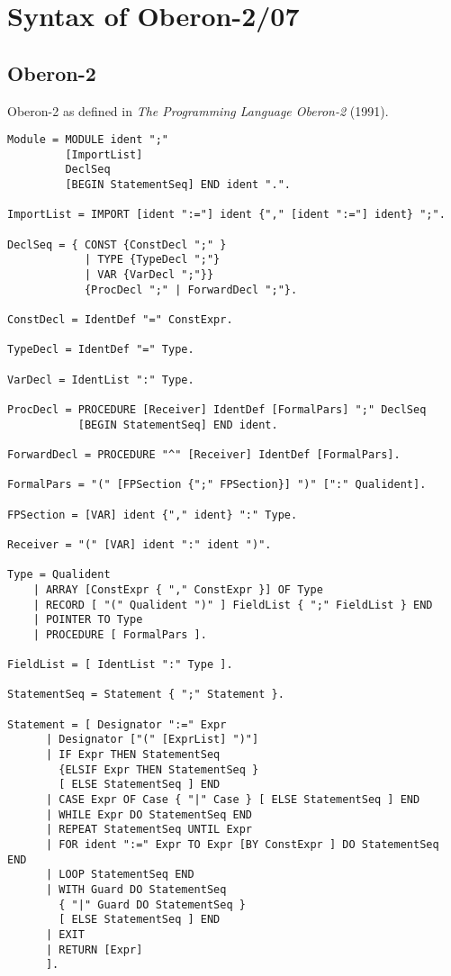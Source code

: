 \documentclass[12pt]{article}
\begin{document}
\newpage
\appendix

\section{Syntax of Oberon-2/07}

\subsection{Oberon-2}

Oberon-2 as defined in {\em The Programming Language Oberon-2} (1991).

{\scriptsize
\begin{lstlisting}[style=EBNF]
Module = MODULE ident ";" 
         [ImportList] 
         DeclSeq 
         [BEGIN StatementSeq] END ident ".".

ImportList = IMPORT [ident ":="] ident {"," [ident ":="] ident} ";".

DeclSeq = { CONST {ConstDecl ";" } 
            | TYPE {TypeDecl ";"} 
            | VAR {VarDecl ";"}} 
            {ProcDecl ";" | ForwardDecl ";"}.

ConstDecl = IdentDef "=" ConstExpr.

TypeDecl = IdentDef "=" Type.

VarDecl = IdentList ":" Type.

ProcDecl = PROCEDURE [Receiver] IdentDef [FormalPars] ";" DeclSeq 
           [BEGIN StatementSeq] END ident.

ForwardDecl = PROCEDURE "^" [Receiver] IdentDef [FormalPars].

FormalPars = "(" [FPSection {";" FPSection}] ")" [":" Qualident].

FPSection = [VAR] ident {"," ident} ":" Type.

Receiver = "(" [VAR] ident ":" ident ")".

Type = Qualident
    | ARRAY [ConstExpr { "," ConstExpr }] OF Type
    | RECORD [ "(" Qualident ")" ] FieldList { ";" FieldList } END 
    | POINTER TO Type
    | PROCEDURE [ FormalPars ].

FieldList = [ IdentList ":" Type ].
    
StatementSeq = Statement { ";" Statement }.

Statement = [ Designator ":=" Expr
      | Designator ["(" [ExprList] ")"]
      | IF Expr THEN StatementSeq 
        {ELSIF Expr THEN StatementSeq } 
        [ ELSE StatementSeq ] END
      | CASE Expr OF Case { "|" Case } [ ELSE StatementSeq ] END
      | WHILE Expr DO StatementSeq END
      | REPEAT StatementSeq UNTIL Expr
      | FOR ident ":=" Expr TO Expr [BY ConstExpr ] DO StatementSeq END
      | LOOP StatementSeq END
      | WITH Guard DO StatementSeq 
        { "|" Guard DO StatementSeq } 
        [ ELSE StatementSeq ] END
      | EXIT
      | RETURN [Expr] 
      ].


\end{lstlisting}}
\end{document}
